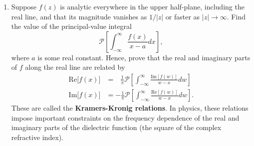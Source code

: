 \documentclass[10pt,a4paper]{article}
\begin{document}
\begin{enumerate}
\item
    Suppose \(f(z)\) is analytic everywhere in the upper half-plane,
  including the real line, and that its magnitude vanishes as \(1/|z|\)
  or faster as \(|z| \rightarrow \infty\). Find the value of the
  principal-value integral
  \begin{equation}
    \mathcal{P}\left[\int_{-\infty}^\infty \frac{f(x)}{x-a} dx \right],
  \end{equation}
  where \(a\) is some real constant. Hence, prove that the real and
  imaginary parts of \(f\) along the real line are related by
  \begin{align}
    \mathrm{Re}\big[f(x)\big]
    &= \;\;\,\frac{1}{\pi} \mathcal{P}\left[\int_{-\infty}^\infty
      \frac{\mathrm{Im}[f(w)]}{w-x} dw\right]
    \\ \mathrm{Im}\big[f(x)\big]
    &= -\frac{1}{\pi} \mathcal{P}\left[\int_{-\infty}^\infty
      \frac{\mathrm{Re}[f(w)]}{w-x} dw\right].
  \end{align}
  These are called the \textbf{Kramers-Kronig relations}. In physics,
  these relations impose important constraints on the frequency
  dependence of the real and imaginary parts of the dielectric
  function (the square of the complex refractive index).
\end{enumerate}
\end{document}
